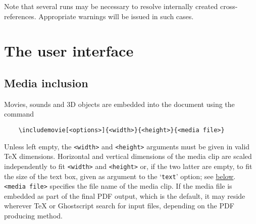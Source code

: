 \documentclass[a4paper]{article}
\begin{document}
Note that several runs may be necessary to resolve internally created cross-references. Appropriate warnings will be issued in such cases.

\section{The user interface}
\subsection{Media inclusion}\label{usrif}
Movies, sounds and 3D objects are embedded into the document using the command
\begin{verbatim}
    \includemovie[<options>]{<width>}{<height>}{<media file>}
\end{verbatim}
Unless left empty, the \verb+<width>+ and \verb+<height>+ arguments must be given in valid \TeX{} dimensions. Horizontal and vertical dimensions of the media clip are scaled independently to fit \verb+<width>+ and \verb+<height>+ or, if the two latter are empty, to fit the size of the text box, given as argument to the `\verb+text+' option; see \hyperlink{lnk:textoption}{below}. \verb+<media file>+ specifies the file name of the media clip. If the media file is embedded as part of the final PDF output, which is the default, it may reside wherever \TeX{} or Ghostscript search for input files, depending on the PDF producing method.
\end{document}
